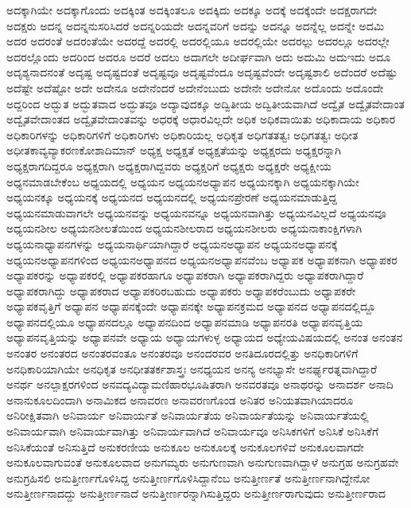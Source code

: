 {ಅದಕ್ಕಾಗಿಯೇ
ಅದಕ್ಕಾಗೊಂದು
ಅದಕ್ಕಿಂತ
ಅದಕ್ಕಿಂತಲೂ
ಅದಕ್ಕಿದು
ಅದಕ್ಕೂ
ಅದಕ್ಕೆ
ಅದಕ್ಕೆಂದೇ
ಅದಕ್ಷರಾಗದೇ
ಅದಕ್ಷರು
ಅದನ್ನ
ಅದನ್ನನುಸರಿಸಿದರೆ
ಅದನ್ನರಿಯದೇ
ಅದನ್ನವರಿಗೆ
ಅದನ್ನು
ಅದನ್ನೂ
ಅದನ್ನೆಲ್ಲ
ಅದನ್ನೇ
ಅದಮಿ
ಅದರ
ಅದರಂತೆ
ಅದರಂತೆಯೇ
ಅದರದ್ದೆ
ಅದರಲ್ಲಿ
ಅದರಲ್ಲಿಯೂ
ಅದರಲ್ಲಿಯೇ
ಅದರಲ್ಲು
ಅದರಲ್ಲೂ
ಅದರಲ್ಲೇ
ಅದರಲ್ಲೊಂದು
ಅದರಿಂದ
ಅದರೂ
ಅದರೆ
ಅದಲು
ಅದಾಗಲೇ
ಅದೀರ್ಘವಾಗಿ
ಅದು
ಅದುಮಿ
ಅದುಇದು
ಅದೂ
ಅದೃಶ್ಯನಾದನಂತೆ
ಅದೃಷ್ಟ
ಅದೃಷ್ಟದಂತೆ
ಅದೃಷ್ಟವೂ
ಅದೃಷ್ಟವೆಂದೂ
ಅದೃಷ್ಟವೆಂದೇ
ಅದೃಷ್ಟಶಾಲಿ
ಅದೆಂದರೆ
ಅದೆಷ್ಟು
ಅದೆಷ್ಟೇ
ಅದೆಷ್ಟೋ
ಅದೇ
ಅದೇನೂ
ಅದೇನೆಂದರೆ
ಅದೇನೆಂಬುದು
ಅದೇನೇ
ಅದೇನೋ
ಅದೊಂದು
ಅದೊಂದೇ
ಅದ್ದರಿಂದ
ಅದ್ಭುತ
ಅದ್ಭುತವಾದ
ಅದ್ಭುತವೂ
ಅದ್ಯಾವುದಕ್ಕೂ
ಅದ್ವಿತೀಯ
ಅದ್ವಿತೀಯವಾಗಿದೆ
ಅದ್ವೈತ
ಅದ್ವೈತವೇದಾಂತ
ಅದ್ವೈತವೇದಾಂತದ
ಅದ್ವೈತವೇದಾಂತವನ್ನು
ಅಧರಕ್ಕೆ
ಅಧಾರವಿಲ್ಲದೇ
ಅಧಿಕ
ಅಧಿಕವಾಯಿತು
ಅಧಿಕಾದಾಯ
ಅಧಿಕಾರ
ಅಧಿಕಾರಿಗಳನ್ನು
ಅಧಿಕಾರಿಗಳಿಗೆ
ಅಧಿಕಾರಿಗಳು
ಅಧಿಕಾರಿಯಲ್ಲ
ಅಧಿಕೃತ
ಅಧಿಗತತತ್ವಃ
ಅಧಿಗತತ್ವಃ
ಅಧೀತ
ಅಧೀತಕಾವ್ಯವ್ಯಾಕರಣಕೋಶಾದಿಮಾನ್
ಅಧ್ಯಕ್ಷ
ಅಧ್ಯಕ್ಷತೆ
ಅಧ್ಯಕ್ಷತೆಯನ್ನು
ಅಧ್ಯಕ್ಷರದು
ಅಧ್ಯಕ್ಷರನ್ನಾಗಿ
ಅಧ್ಯಕ್ಷರಾಗದಿದ್ದರೂ
ಅಧ್ಯಕ್ಷರಾಗಿ
ಅಧ್ಯಕ್ಷರಾಗಿದ್ದವರು
ಅಧ್ಯಕ್ಷರಿಗೆ
ಅಧ್ಯಕ್ಷರು
ಅಧ್ಯಕ್ಷರೇ
ಅಧ್ಯಕ್ಷೀಯ
ಅಧ್ಯನಮಾಡಬೇಕೆಂಬ
ಅಧ್ಯಯದಲ್ಲಿ
ಅಧ್ಯಯನ
ಅಧ್ಯಯನಅಧ್ಯಾಪನ
ಅಧ್ಯಯನಕ್ಕಾಗಿ
ಅಧ್ಯಯನಕ್ಕಾಗಿಯೇ
ಅಧ್ಯಯನಕ್ಕೂ
ಅಧ್ಯಯನಕ್ಕೆ
ಅಧ್ಯಯನದ
ಅಧ್ಯಯನದಲ್ಲಿ
ಅಧ್ಯಯನಪ್ರೇರಣೆ
ಅಧ್ಯಯನಮಾಡುತ್ತಿದ್ದ
ಅಧ್ಯಯನಮಾಡುವಾಗಲೇ
ಅಧ್ಯಯನವನ್ನು
ಅಧ್ಯಯನವನ್ನೂ
ಅಧ್ಯಯನವಾಗಿತ್ತು
ಅಧ್ಯಯನವಿಲ್ಲದೆ
ಅಧ್ಯಯನವೂ
ಅಧ್ಯಯನಶೀಲ
ಅಧ್ಯಯನಶೀಲತೆಯಿಂದ
ಅಧ್ಯಯನಶೀಲರಾದ
ಅಧ್ಯಯನಶೀಲರು
ಅಧ್ಯಯನಾಕಾಂಕ್ಷಿಗಳಾಗಿ
ಅಧ್ಯಯನಾಧ್ಯಾಪನಗಳನ್ನು
ಅಧ್ಯಯನಾರ್ಥಿಯಾಗಿದ್ದಾರೆ
ಅಧ್ಯಯನಅಧ್ಯಾಪನ
ಅಧ್ಯಯನಅಧ್ಯಾಪನಕ್ಕೆ
ಅಧ್ಯಯನಅಧ್ಯಾಪನಗಳಿಂದ
ಅಧ್ಯಯನಅಧ್ಯಾಪನದ
ಅಧ್ಯಯನಅಧ್ಯಾಪನವೆಂಬ
ಅಧ್ಯಾಪಕ
ಅಧ್ಯಾಪಕನಾಗಿ
ಅಧ್ಯಾಪಕರ
ಅಧ್ಯಾಪಕರನ್ನು
ಅಧ್ಯಾಪಕರಲ್ಲಿ
ಅಧ್ಯಾಪಕರಹಾಗೂ
ಅಧ್ಯಾಪಕರಾಗಿ
ಅಧ್ಯಾಪಕರಾಗಿದ್ದರು
ಅಧ್ಯಾಪಕರಾಗಿದ್ದಾರೆ
ಅಧ್ಯಾಪಕರಾಗಿದ್ದು
ಅಧ್ಯಾಪಕರಾದ
ಅಧ್ಯಾಪಕರಿರಬಹುದು
ಅಧ್ಯಾಪಕರು
ಅಧ್ಯಾಪಕರೆಂಬುದು
ಅಧ್ಯಾಪಕರೇ
ಅಧ್ಯಾಪಕವೃತ್ತಿಗೆ
ಅಧ್ಯಾಪನ
ಅಧ್ಯಾಪನಕ್ಕೆಂದೇ
ಅಧ್ಯಾಪನಕ್ಕೇ
ಅಧ್ಯಾಪನಕ್ರಮದ
ಅಧ್ಯಾಪನದ
ಅಧ್ಯಾಪನದಲ್ಲಿದ್ದೂ
ಅಧ್ಯಾಪನದಲ್ಲಿಯೂ
ಅಧ್ಯಾಪನದಲ್ಲೂ
ಅಧ್ಯಾಪನದಿಂದ
ಅಧ್ಯಾಪನಮಾಡಿ
ಅಧ್ಯಾಪನರತಿ
ಅಧ್ಯಾಪನವೃತ್ತಿಯ
ಅಧ್ಯಾಪನವೃತ್ತಿಯನ್ನು
ಅಧ್ಯಾಪನವೇ
ಅಧ್ಯಾಯ
ಅಧ್ಯಾಯಗಳುಳ್ಳ
ಅಧ್ಯಾಯದ
ಅಧ್ಯೇಯವಿಷಯದಲ್ಲಿ
ಅನಂತ
ಅನಂತನ
ಅನಂತರ
ಅನಂತರದ
ಅನಂತರವಂತೂ
ಅನಂತರವೂ
ಅನಂದರವರ
ಅನತಿದೂರದಲ್ಲಿತ್ತು
ಅನಧಿಕಾರಿಗಳಿಗೆ
ಅನಧಿಕಾರಿಯಾಗಿಯೇ
ಅನಧಿಕೃತ
ಅನಧೀತತರ್ಕಶಾಸ್ತ್ರಃ
ಅನಧ್ಯಯನ
ಅನನ್ಯ
ಅನಭ್ಯಾಸೇ
ಅನರ್ಘ್ಯರತ್ನವಾಗಿದ್ದಾರೆ
ಅನರ್ಥ
ಅನಲ್ಪಾಕ್ಷರಗಳಿಂದ
ಅನವದ್ಯವಿದ್ಯಾಮಣಿಹಾರಭೂಷಿತರಾಗಿ
ಅನವರತವೂ
ಅನಾಥರನ್ನು
ಅನಾದರ್ಶ
ಅನಾದಿ
ಅನಾನುಕೂಲದಿಂದಾಗಿ
ಅನಾಮಿಕದ
ಅನಾವರಣ
ಅನಾವರಣಗೊಂಡ
ಅನಿತರ
ಅನಿಯತವಾಗಿಯಾದರೂ
ಅನಿರೀಕ್ಷಿತವಾಗಿ
ಅನಿವಾರ್ಯ
ಅನಿವಾರ್ಯತೆ
ಅನಿವಾರ್ಯತೆಯ
ಅನಿವಾರ್ಯತೆಯನ್ನು
ಅನಿವಾರ್ಯತೆಯಲ್ಲಿ
ಅನಿವಾರ್ಯವಾಗಿ
ಅನಿವಾರ್ಯವಾಗಿತ್ತು
ಅನಿವಾರ್ಯವಾಗಿದೆ
ಅನಿವಾರ್ಯವೂ
ಅನಿಸಿಕಗಳಿಗೆ
ಅನಿಸಿಕೆ
ಅನಿಸಿಕೆಗೆ
ಅನಿಸಿಕೆಯಂತೆ
ಅನಿಸುತ್ತಿದೆ
ಅನುಕರಣೀಯ
ಅನುಕೂಲ
ಅನುಕೂಲಕ್ಕೆ
ಅನುಕೂಲಗಳಿವೆ
ಅನುಕೂಲವಾಗದೇ
ಅನುಕೂಲವಾಗುವಂತೆ
ಅನುಕೂಲವಾದ
ಅನುಗಮ್ಯರು
ಅನುಗುಣವಾಗಿ
ಅನುಗುಣವಾಗಿದ್ದಾಳೆ
ಅನುಗ್ರಹ
ಅನುಗ್ರಹವೇ
ಅನುಗ್ರಹಿಸಲಿ
ಅನುತ್ತೀರ್ಣಗೊಳಿಸಿದ್ದ
ಅನುತ್ತೀರ್ಣಗೊಳಿಸಿದ್ದಾನೆಂಬ
ಅನುತ್ತೀರ್ಣತೆ
ಅನುತ್ತೀರ್ಣನಾಗಿದ್ದೇನೋ
ಅನುತ್ತೀರ್ಣನಾದದ್ದು
ಅನುತ್ತೀರ್ಣನಾದೆ
ಅನುತ್ತೀರ್ಣರನ್ನಾಗಿಸುತ್ತಿದ್ದರು
ಅನುತ್ತೀರ್ಣರಾಗುವುದು
ಅನುತ್ತೀರ್ಣರಾದ
}
